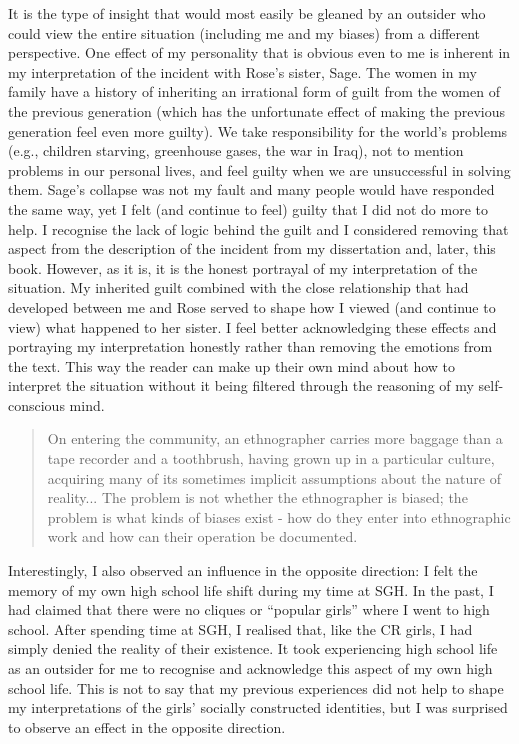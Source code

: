 \noindent It is the type of insight that would most easily be gleaned by an outsider who could view the entire situation (including me and my biases) from a different perspective. One effect of my personality that is obvious even to me is inherent in my interpretation of the incident with Rose's sister, Sage. The women in my family have a history of inheriting an irrational form of guilt from the women of the previous generation (which has the unfortunate effect of making the previous generation feel even more guilty). We take responsibility for the world's problems (e.g., children starving, greenhouse gases, the war in Iraq), not to mention problems in our personal lives, and feel guilty when we are unsuccessful in solving them. Sage's collapse was not my fault and many people would have responded the same way, yet I felt (and continue to feel) guilty that I did not do more to help. I recognise the lack of logic behind the guilt and I considered removing that aspect from the description of the incident from my dissertation and, later, this book. However, as it is, it is the honest portrayal of my interpretation of the situation. My inherited guilt combined with the close relationship that had developed between me and Rose served to shape how I viewed (and continue to view) what happened to her sister. I feel better acknowledging these effects and portraying my interpretation honestly rather than removing the emotions from the text. This way the reader can make up their own mind about how to interpret the situation without it being filtered through the reasoning of my self-conscious mind.

\begin{quote}
	On entering the community, an ethnographer carries more baggage than a tape recorder and a toothbrush, having grown up in a particular culture, acquiring many of its sometimes implicit assumptions about the nature of reality... The problem is not whether the ethnographer is biased; the problem is what kinds of biases exist - how do they enter into ethnographic work and how can their operation be documented. \citep[41-2]{agar1980}
\end{quote}

\noindent Interestingly, I also observed an influence in the opposite direction: I felt the memory of my own high school life shift during my time at SGH. In the past, I had claimed that there were no cliques or ``popular girls'' where I went to high school. After spending time at SGH, I realised that, like the CR girls, I had simply denied the reality of their existence. It took experiencing high school life as an outsider for me to recognise and acknowledge this aspect of my own high school life. This is not to say that my previous experiences did not help to shape my interpretations of the girls' socially constructed identities, but I was surprised to observe an effect in the opposite direction.

